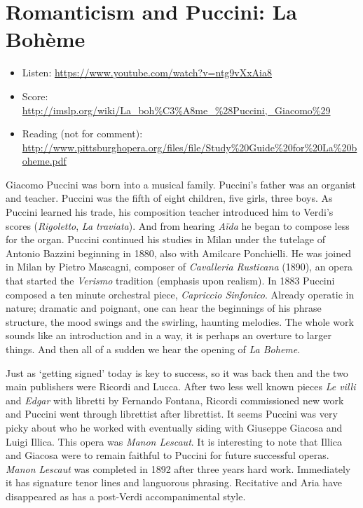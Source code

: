 \section{Romanticism and Puccini: La Boh\`eme}
\begin{itemize}
\item Listen: \url{https://www.youtube.com/watch?v=ntg9vXxAia8}
\item Score: \url{http://imslp.org/wiki/La_boh%C3%A8me_%28Puccini,_Giacomo%29}
\item Reading (not for comment): \url{http://www.pittsburghopera.org/files/file/Study%20Guide%20for%20La%20boheme.pdf}
\end{itemize}

Giacomo Puccini was born into a musical family. Puccini's father was an organist and teacher. Puccini was the fifth of eight children, five girls, three boys. As Puccini learned his trade, his composition teacher introduced him to Verdi's scores (\textit{Rigoletto}, \textit{La traviata}). And from hearing \textit{A\"ida} he began to compose less for the organ. Puccini continued his studies in Milan under the tutelage of Antonio Bazzini beginning in 1880, also with Amilcare Ponchielli. He was joined in Milan by Pietro Mascagni, composer of \textit{Cavalleria Rusticana} (1890), an opera that started the \textit{Verismo} tradition (emphasis upon realism). In 1883 Puccini composed a ten minute orchestral piece, \textit{Capriccio Sinfonico}. Already operatic in nature; dramatic and poignant, one  can hear the beginnings of his phrase structure, the mood swings and the swirling, haunting melodies. The whole work sounds like an introduction and in a way, it is perhaps an overture to larger things. And then all of a sudden we hear the opening of \textit{La Boheme}. 

Just as `getting signed' today is key to success, so it was back then and the two main publishers were Ricordi and Lucca. After two less well known pieces \textit{Le villi} and \textit{Edgar} with libretti by Fernando Fontana, Ricordi commissioned new work and Puccini went through librettist after librettist. It seems Puccini was very picky about who he worked with eventually siding with Giuseppe Giacosa and Luigi Illica. This opera was \textit{Manon Lescaut}. It is interesting to note that Illica and Giacosa were to remain faithful to Puccini for future successful operas. \textit{Manon Lescaut} was completed in 1892 after three years hard work. Immediately it has signature tenor lines and languorous phrasing. Recitative and Aria have disappeared as has a post-Verdi accompanimental style. 


